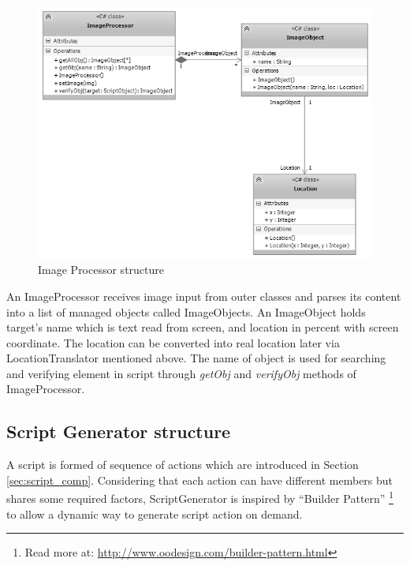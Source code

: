 	\begin{figure}[H]
		\centering
		\includegraphics[scale=0.75]{Chapters/Fig/img_processor.png}
		\caption{Image Processor structure}
		\label{fig:img_processor}
	\end{figure}

An ImageProcessor receives image input from outer classes and parses its content into a list of managed objects called ImageObjects. An ImageObject holds target's name which is text read from screen, and location in percent with screen coordinate. The location can be converted into real location later via LocationTranslator mentioned above. The name of object is used for searching and verifying element in script through \textit{getObj} and \textit{verifyObj} methods of ImageProcessor.

\subsection{Script Generator structure}
A script is formed of sequence of actions which are introduced in Section \ref{sec:script_comp}. Considering that each action can have different members but shares some required factors, ScriptGenerator is inspired by ``Builder Pattern'' \footnote{Read more at: \url{http://www.oodesign.com/builder-pattern.html}} to allow a dynamic way to generate script action on demand.

